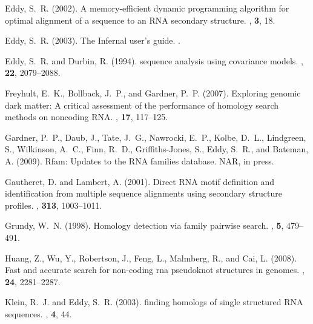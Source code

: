 \documentclass{bioinfo}
\begin{document}
\begin{application}
\begin{thebibliography}{}
Eddy, S.~R. (2002).
\newblock A memory-efficient dynamic programming algorithm for optimal
  alignment of a sequence to an {RNA} secondary structure.
, {\bf 3}, 18.

Eddy, S.~R. (2003).
\newblock The {I}nfernal user's guide.
.

Eddy, S.~R. and Durbin, R. (1994).
 sequence analysis using covariance models.
, {\bf 22}, 2079--2088.

Freyhult, E.~K., Bollback, J.~P., and Gardner, P.~P. (2007).
\newblock Exploring genomic dark matter: A critical assessment of the
  performance of homology search methods on noncoding {RNA}.
, {\bf 17}, 117--125.

Gardner, P.~P., Daub, J., Tate, J.~G., Nawrocki, E.~P., Kolbe, D.~L.,
  Lindgreen, S., Wilkinson, A.~C., Finn, R.~D., Griffiths-Jones, S., Eddy,
  S.~R., and Bateman, A. (2009).
\newblock Rfam: Updates to the {RNA} families database.
\newblock NAR, in press.

Gautheret, D. and Lambert, A. (2001).
\newblock Direct {RNA} motif definition and identification from multiple
  sequence alignments using secondary structure profiles.
, {\bf 313}, 1003--1011.

Grundy, W.~N. (1998).
\newblock Homology detection via family pairwise search.
, {\bf 5}, 479--491.

Huang, Z., Wu, Y., Robertson, J., Feng, L., Malmberg, R., and Cai, L. (2008).
\newblock Fast and accurate search for non-coding rna pseudoknot structures in
  genomes.
, {\bf 24}, 2281--2287.

Klein, R.~J. and Eddy, S.~R. (2003).
 finding homologs of single structured {RNA} sequences.
, {\bf 4}, 44.


\end{thebibliography}
\end{application}
\end{document}
